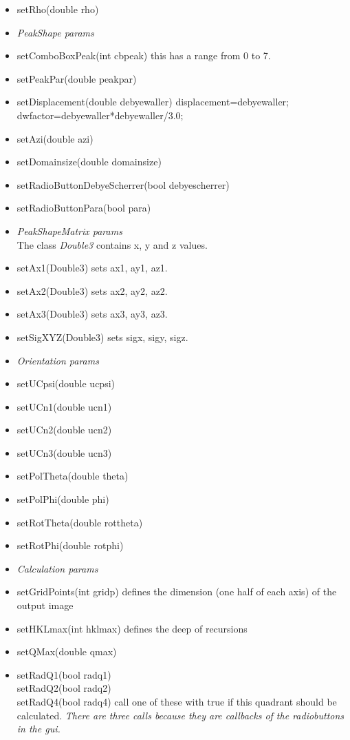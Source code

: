 \documentclass[11pt]{article} %
\begin{document}
\begin{itemize}
\item setRho(double rho)
% 
\item[] {\it PeakShape params}
\item setComboBoxPeak(int cbpeak) this has a range from 0 to 7.
\item setPeakPar(double peakpar)
\item setDisplacement(double debyewaller) displacement=debyewaller; dwfactor=debyewaller*debyewaller/3.0;
\item setAzi(double azi)
\item setDomainsize(double domainsize)
\item setRadioButtonDebyeScherrer(bool debyescherrer)
\item setRadioButtonPara(bool para)
% 
\item[] {\it PeakShapeMatrix params} \\
	The class {\it Double3} contains x, y and z values.
\item setAx1(Double3) sets ax1, ay1, az1.
\item setAx2(Double3) sets ax2, ay2, az2.
\item setAx3(Double3) sets ax3, ay3, az3.
\item setSigXYZ(Double3) sets sigx, sigy, sigz.
% 
\item[] {\it Orientation params}
\item setUCpsi(double ucpsi)
\item setUCn1(double ucn1)
\item setUCn2(double ucn2)
\item setUCn3(double ucn3)
\item setPolTheta(double theta)
\item setPolPhi(double phi)
\item setRotTheta(double rottheta)
\item setRotPhi(double rotphi)
% 
\item[] {\it Calculation params}
\item setGridPoints(int gridp) defines the dimension (one half of each axis) of the output image
\item setHKLmax(int hklmax) defines the deep of recursions
\item setQMax(double qmax)
\item setRadQ1(bool radq1) \\
	setRadQ2(bool radq2) \\
	setRadQ4(bool radq4) call one of these with true if this quadrant should be calculated. {\it There are three calls because they are callbacks of the radiobuttons in the gui.}

\end{itemize}
\end{document}
